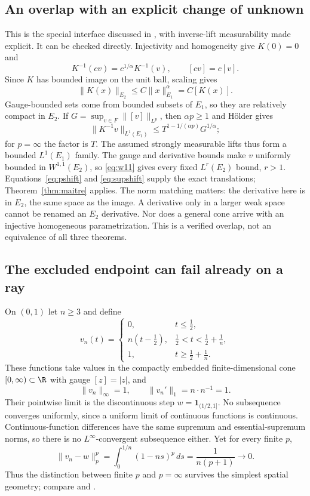 \documentclass[12pt,reqno]{amsart}
\begin{document}
\subsection{An overlap with an explicit change of unknown}
\begin{proposition}\label{prop:overlap}

\end{proposition}
This is the special interface discussed in \cite[Section 4, pp.~15--16]{S-barrett-suli}, with inverse-lift measurability made explicit. It can be checked directly.
Injectivity and homogeneity give $K(0)=0$ and
\[
K^{-1}(cv)=c^{1/\alpha}K^{-1}(v),\qquad [cv]=c[v].
\]
Since $K$ has bounded image on the unit ball, scaling gives
\[
\|K(x)\|_{E_2}\le C\|x\|_{E_1}^{\alpha}=C[K(x)].
\]
Gauge-bounded sets come from bounded subsets of $E_1$, so they are relatively compact in $E_2$.
If $G=\sup_{v\in F}\|[v]\|_{L^p}$, then $\alpha p\ge1$ and H\"older gives
\begin{equation}\label{eq:lift}
\|K^{-1}v\|_{L^1(E_1)}
\le T^{1-1/(\alpha p)}G^{1/\alpha};
\end{equation}
for $p=\infty$ the factor is $T$. The assumed strongly measurable lifts thus form a bounded $L^1(E_1)$ family. The gauge and derivative bounds make $v$ uniformly bounded in $W^{1,1}(E_2)$, so \eqref{eq:w11} gives every fixed $L^r(E_2)$ bound, $r>1$. Equations~\eqref{eq:pshift} and \eqref{eq:supshift} supply the exact translations; Theorem~\ref{thm:maitre} applies.
The norm matching matters: the derivative here is in $E_2$, the same space as the image. A derivative only in a larger weak space cannot be renamed an $E_2$ derivative. Nor does a general cone arrive with an injective homogeneous parametrization. This is a verified overlap, not an equivalence of all three theorems.
\subsection{The excluded endpoint can fail already on a ray}
On $(0,1)$ let $n\ge3$ and define
\[
v_n(t)=\begin{cases}
0,&t\le\tfrac12,\\
n(t-\tfrac12),&\tfrac12<t<\tfrac12+\tfrac1n,\\
1,&t\ge\tfrac12+\tfrac1n.
\end{cases}
\]
These functions take values in the compactly embedded finite-dimensional cone $[0,\infty)\subset\R$ with gauge $[z]=|z|$, and
\[
\|v_n\|_\infty=1,\qquad \|v_n'\|_1=n\cdot n^{-1}=1.
\]
Their pointwise limit is the discontinuous step $w=\mathbf1_{(1/2,1]}$. No subsequence converges uniformly, since a uniform limit of continuous functions is continuous. Continuous-function differences have the same supremum and essential-supremum norms, so there is no $L^\infty$-convergent subsequence either. Yet for every finite $p$,
\begin{equation}\label{eq:ramp}
\|v_n-w\|_p^p=\int_0^{1/n}(1-ns)^p\,ds=\frac1{n(p+1)}\longrightarrow0.
\end{equation}
Thus the distinction between finite $p$ and $p=\infty$ survives the simplest spatial geometry; compare \cite[Corollary 4, pp.~85--86; Proposition 3, p.~94]{S-simon} and \cite[Remark 2, p.~4]{S-barrett-suli}.
\end{document}
